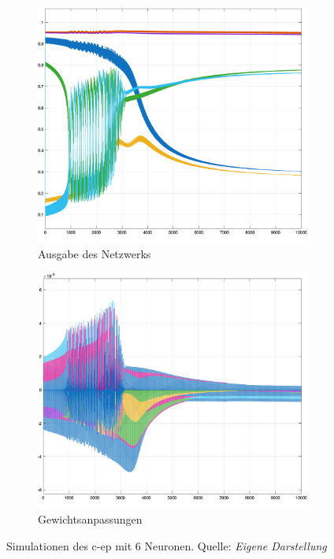 \begin{figure}[h]
  \centering
  \begin{subfigure}[b]{0.5\textwidth}
    \includegraphics[width=\textwidth]{abbildungen/c_ep_sim_3_ausgabe.png}
    \caption{Ausgabe des Netzwerks}
  \end{subfigure}%
  \hfill
  \begin{subfigure}[b]{0.5\textwidth}
    \includegraphics[width=\textwidth]{abbildungen/c_ep_sim_3_weight_update.png}
    \caption{Gewichtsanpassungen}
  \end{subfigure}
  \caption{Simulationen des \gls{c-ep} mit 6 Neuronen. Quelle: \textit{Eigene Darstellung}}
  \label{fig:C-EP Sim 3}
\end{figure}
